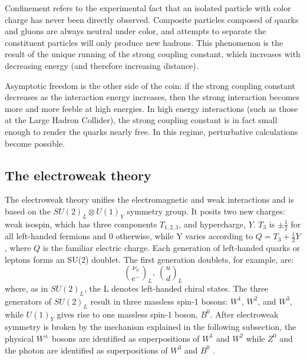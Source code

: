 Confinement refers to the experimental fact that an isolated particle with color charge has never been directly observed. Composite particles composed of quarks and gluons are always neutral under color, and attempts to separate the constituent particles will only produce new hadrons. This phenomenon is the result of the unique running of the strong coupling constant, which increases with decreasing energy (and therefore increasing distance).    

Asymptotic freedom is the other side of the coin: if the strong coupling constant decreases as the interaction energy increases, then the strong interaction becomes more and more feeble at high energies. In high energy interactions (such as those at the Large Hadron Collider), the strong coupling constant is in fact small enough to render the quarks nearly free. In this regime, perturbative calculations become possible.

\subsection{The electroweak theory}
The electroweak theory unifies the electromagnetic and weak interactions and is based on the $SU(2)_{L} \otimes U(1)_{Y}$ symmetry group. It posits two new charges: weak isospin, which has three components $T_{1,2,3}$, and hypercharge, $Y$. $T_{3}$ is $\pm\frac{1}{2}$ for all left-handed fermions and 0 otherwise, while Y varies according to $Q=T_{3}+\frac{1}{2}Y$, where $Q$ is the familiar electric charge. Each generation of left-handed quarks or leptons forms an SU(2) doublet. The first generation doublets, for example, are:
\begin{equation}
    \binom{\nu_{e}}{e^{-}}_{L},\ \binom{u}{d}_{L}
\end{equation}
where, as in $SU(2)_{L}$, the L denotes left-handed chiral states. The three generators of $SU(2)_{L}$ result in three massless spin-1 bosons: $W^{1}$, $W^{2}$, and $W^{3}$, while $U(1)_{Y}$ gives rise to one massless spin-1 boson, $B^{0}$. After electroweak symmetry is broken by the mechanism explained in the following subsection, the physical $W^{\pm}$ bosons are identified as superpositions of $W^{1}$ and $W^{2}$ while $Z^0$ and the photon are identified as superpositions of $W^{3}$ and $B^{0}$ \cite{weinberg_leptons}.

